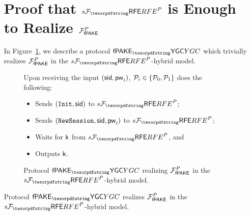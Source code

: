 
\section{Proof that $\Fsrfe^{P}$ is Enough to Realize $\mathcal{F}_\textsf{fPAKE}^{P}$}
\label{sec:ygcfakeproof}

In Figure~\ref{fig:YGCFAKE}, we describe a protocol $\PfakeYGC$ which trivially realizes $\mathcal{F}_\textsf{fPAKE}^{P}$ in the $\Fsrfe^{P}$-hybrid model.


\begin{figure}[htbp]
  \centering
  \begin{fboxenv}
    \begin{minipage}{0.95\textwidth}
    	Upon receiving the input $(\mathsf{sid}, \mathsf{pw}_{i})$, $\mathcal{P}_{i} \in \{\mathcal{P}_{0}, \mathcal{P}_{1}\}$ does the following:
	\begin{itemize}
	\item Sends $(\texttt{Init}, \mathsf{sid})$ to $\Fsrfe^{P}$;
	\item Sends $(\texttt{NewSession}, \mathsf{sid}, \mathsf{pw}_{i})$ to $\Fsrfe^{P}$;
	\item Waits for $\mathsf{k}$ from $\Fsrfe^{P}$, and 
	\item Outputs $\mathsf{k}$.
	\end{itemize}
    \end{minipage}
  \end{fboxenv}
  \caption{Protocol $\PfakeYGC$ realizing $\mathcal{F}_\textsf{fPAKE}^{P}$ in the $\Fsrfe^{P}$-hybrid model.}
  \label{fig:YGCFAKE}
\end{figure}

\begin{theorem}
Protocol $\PfakeYGC$ realizes $\mathcal{F}_\textsf{fPAKE}^{P}$ in the $\Fsrfe^{P}$-hybrid model.
\end{theorem}


